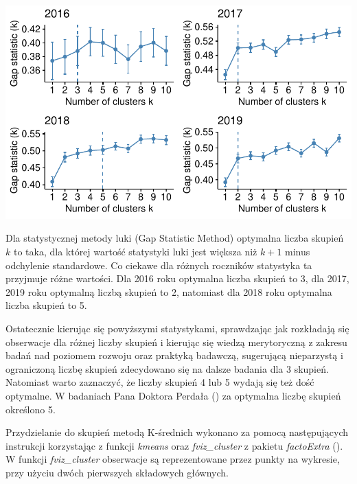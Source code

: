\documentclass{amuthesis}
\begin{document}
\begin{center}\includegraphics[width=1\linewidth]{figures/unnamed-chunk-11-1} \end{center}

Dla statystycznej metody luki (Gap Statistic Method) optymalna liczba skupień \(k\) to taka, dla której wartość statystyki luki jest większa niż \(k+1\) minus odchylenie standardowe. Co ciekawe dla różnych roczników statystyka ta przyjmuje różne wartości. Dla 2016 roku optymalna liczba skupień to 3, dla 2017, 2019 roku optymalną liczbą skupień to 2, natomiast dla 2018 roku optymalna liczba skupień to 5.

Ostatecznie kierując się powyższymi statystykami, sprawdzając jak rozkładają się obserwacje dla różnej liczby skupień i kierując się wiedzą merytoryczną z zakresu badań nad poziomem rozwoju oraz praktyką badawczą, sugerującą nieparzystą i ograniczoną liczbę skupień zdecydowano się na dalsze badania dla 3 skupień. Natomiast warto zaznaczyć, że liczby skupień 4 lub 5 wydają się też dość optymalne. W badaniach Pana Doktora Perdała (\textcite{perdal_zastosowanie}) za optymalna liczbę skupień określono 5.

Przydzielanie do skupień metodą K-średnich wykonano za pomocą następujących instrukcji korzystając z funkcji \emph{kmeans} oraz \emph{fviz\_cluster} z pakietu \emph{factoExtra} (\textcite{R-factoExtra}).
W funkcji \emph{fviz\_cluster} obserwacje są reprezentowane przez punkty na wykresie, przy użyciu dwóch pierwszych składowych głównych.

\begin{Shaded}
\begin{Highlighting}[]
\OtherTok{\textless{}{-}} \SpecialCharTok{$} \NormalTok{, } \NormalTok{)}
\SpecialCharTok{::}\SpecialCharTok{+}\SpecialCharTok{::}\NormalTok{(}\NormalTok{)}
\end{Highlighting}
\end{Shaded}
\end{document}

